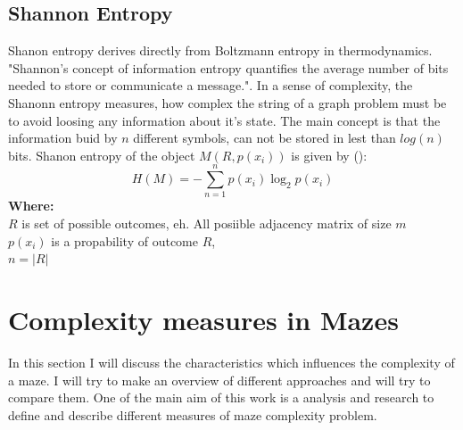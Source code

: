 \subsection{Shannon Entropy}
Shanon entropy derives directly from Boltzmann entropy in thermodynamics. "Shannon’s concept of information entropy quantifies the average number of bits needed to store or communicate a message."\cite{HeZeni}. In a sense of complexity, the Shanonn entropy measures, how complex the string of a graph problem must be to avoid loosing any information about it's state. The main concept is that the information buid by $n$ different symbols, can not be stored in lest than $log(n)$ bits.
Shanon entropy of the object $M(R, p(x_i))$ is given by ()\cite{HeZeni}:
\begin{equation}
H(M) = - \sum_{n = 1}^{n} p(x_i)\log_2 p(x_i)
\end{equation}
\textbf{Where:}\\
$R$ is set of possible outcomes, eh. All posiible adjacency matrix of size $m$\\
$p(x_i)$ is a propability of outcome $R$,\\
$n= |R|$\\
\section{Complexity measures in Mazes}
In this section I will discuss the characteristics which influences the complexity of a maze. I will try to make an overview of different approaches and will try to compare them. 
One of the main aim of this work is a analysis and research to define and describe different measures of maze complexity problem. 
